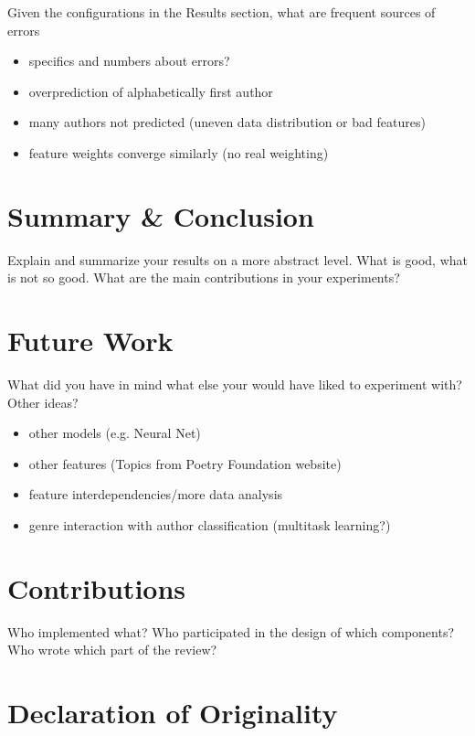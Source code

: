 \documentclass[11pt]{article}
\begin{document}
Given the configurations in the Results section, what are frequent sources of errors
\begin{itemize}
\item specifics and numbers about errors?
\item overprediction of alphabetically first author
\item many authors not predicted (uneven data distribution or bad features)
\item feature weights converge similarly (no real weighting)
\end{itemize}

\section{Summary \& Conclusion}

Explain and summarize your results on a more abstract level. What is good, what is not so
good. What are the main contributions in your experiments?


\section{Future Work}

What did you have in mind what else your
would have liked to experiment with? Other ideas?
\begin{itemize}
\item other models (e.g. Neural Net)
\item other features (Topics from Poetry Foundation website)
\item feature interdependencies/more data analysis
\item genre interaction with author classification (multitask learning?)
\end{itemize}







\appendix

\section{Contributions}
Who implemented what?
Who participated in the design of which components?
Who wrote which part of the review?
\section{Declaration of Originality}
\label{sec:appendix}
\end{document}
